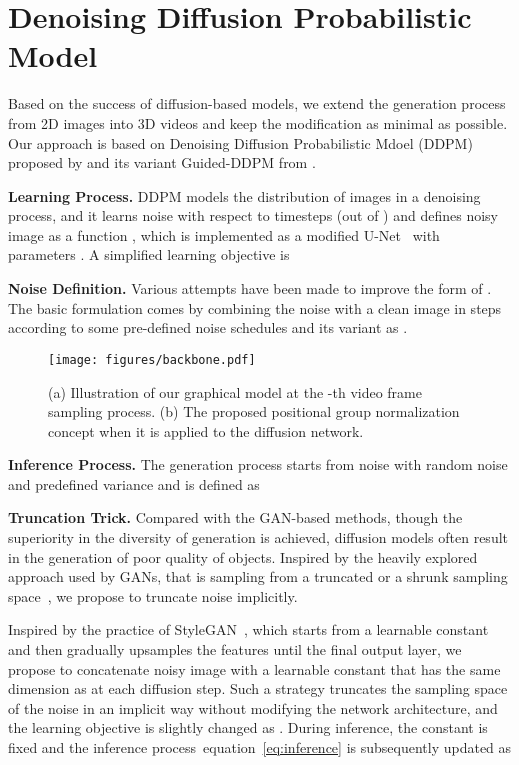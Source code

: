 \documentclass[letterpaper]{article}
\def\eqref#1{equation~\ref{#1}}
\begin{document}
\section{Denoising Diffusion Probabilistic Model}
Based on the success of diffusion-based models, we extend the generation process from 2D images into 3D videos and keep the modification as minimal as possible.
Our approach  is based on Denoising Diffusion Probabilistic Mdoel (DDPM) proposed by \citet{ho2020denoising} and its variant Guided-DDPM from \citet{dhariwal2021diffusion}.

\noindent \textbf{Learning Process.}
DDPM models the distribution of images  in a denoising process, and it learns noise  with respect to timesteps  (out of ) and defines noisy image  as a function , which is implemented as a modified U-Net~\cite{salimans2017pixelcnn++}  with parameters .
A simplified learning objective is


\noindent \textbf{Noise Definition.}
Various attempts have been made to improve the form of .
The basic formulation comes by combining the noise  with a clean image  in  steps according to some pre-defined noise schedules  and its variant  as .

\begin{figure*}[htbp]
  \centering
  \texttt{[image: figures/backbone.pdf]}
  \vspace{-1\baselineskip}
  \caption{(a) Illustration of our graphical model at the -th video frame sampling process. (b) The proposed positional group normalization concept when it is  applied to the diffusion network.}
  \vspace{-.5\baselineskip}
  \label{fig:pipeline}
\end{figure*}

\noindent \textbf{Inference Process.} The generation process starts from noise  with random noise  and predefined variance  and is defined as


\noindent \textbf{Truncation Trick.}
Compared with the GAN-based methods, though the superiority in the diversity of generation is achieved, diffusion models often result in the generation of poor quality of objects.  
Inspired by the heavily explored approach used by GANs, that is sampling from a truncated or a shrunk sampling space~\cite{brock2018large, kingma2018glow, karras2019style}, we propose to truncate noise  implicitly.

Inspired by the practice of StyleGAN~\cite{karras2019style}, which starts from a learnable constant and then gradually upsamples the features until the final output layer, we propose to concatenate noisy image  with a learnable constant  that has the same dimension as  at each diffusion step.
Such a strategy truncates the sampling space of the noise in an implicit way without modifying the network architecture, and the learning objective is slightly changed as .
During inference, the constant  is fixed and the inference process~\eqref{eq:inference} is subsequently updated as
\end{document}
